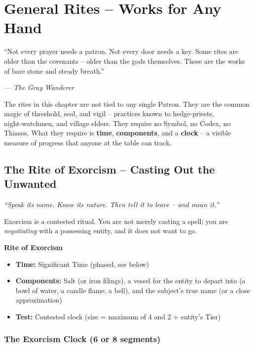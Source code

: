 \documentclass[10pt,a5paper]{book}
\begin{document}
\clearpage

\chapter{General Rites – Works for Any Hand}

\epigraph{“Not every prayer needs a patron. Not every door needs a key. Some rites are older than the covenants – older than the gods themselves. These are the works of bare stone and steady breath.”}{\textit{— The Gray Wanderer}}

The rites in this chapter are not tied to any single Patron. They are the common magic of threshold, seal, and vigil – practices known to hedge‑priests, night‑watchmen, and village elders. They require no Symbol, no Codex, no Thiasos. What they require is \textbf{time}, \textbf{components}, and a \textbf{clock} – a visible measure of progress that anyone at the table can track.

\section{The Rite of Exorcism – Casting Out the Unwanted}

\textit{“Speak its name. Know its nature. Then tell it to leave – and mean it.”}

Exorcism is a contested ritual. You are not merely casting a spell; you are \textit{negotiating} with a possessing entity, and it does not want to go.

\begin{tcolorbox}[colback=blue!5, colframe=blue!70]
\textbf{Rite of Exorcism}
\begin{itemize}
    \item \textbf{Time:} Significant Time (phased, see below)
    \item \textbf{Components:} Salt (or iron filings), a vessel for the entity to depart into (a bowl of water, a candle flame, a bell), and the subject’s true name (or a close approximation)
    \item \textbf{Test:} Contested clock (size = maximum of 4 and 2 + entity’s Tier)
\end{itemize}
\end{tcolorbox}

\subsection*{The Exorcism Clock (6 or 8 segments)}
\end{document}
